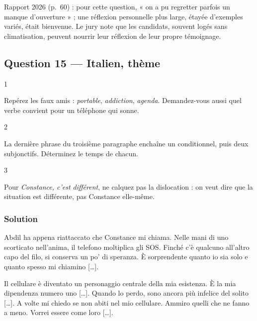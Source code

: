 \documentclass[11pt,a4paper]{article}
\begin{document}
\begin{jury}

Rapport 2026 (p.~60) : pour cette question, « on a pu regretter parfois un manque d'ouverture » ; une réflexion personnelle plus large, étayée d'exemples variés, était bienvenue. Le jury note que les candidats, souvent logés sans climatisation, peuvent nourrir leur réflexion de leur propre témoignage.

\end{jury}

\hypertarget{question-15-italien-thuxe8me}{%
\subsection{Question 15 --- Italien, thème}\label{question-15-italien-thuxe8me}}

\begin{indication}{1}

Repérez les faux amis : \emph{portable}, \emph{addiction}, \emph{agenda}. Demandez-vous aussi quel verbe convient pour un téléphone qui sonne.

\end{indication}

\begin{indication}{2}

La dernière phrase du troisième paragraphe enchaîne un conditionnel, puis deux subjonctifs. Déterminez le temps de chacun.

\end{indication}

\begin{indication}{3}

Pour \emph{Constance, c'est différent}, ne calquez pas la dislocation : on veut dire que la situation est différente, pas Constance elle-même.

\end{indication}

\hypertarget{solution-14}{%
\subsubsection{Solution}\label{solution-14}}

Abdil ha appena riattaccato che Constance mi chiama. Nelle mani di uno scorticato nell'anima, il telefono moltiplica gli SOS. Finché c'è qualcuno all'altro capo del filo, si conserva un po' di speranza. È sorprendente quanto io sia solo e quanto spesso mi chiamino {[}\ldots{]}.

Il cellulare è diventato un personaggio centrale della mia esistenza. È la mia dipendenza numero uno {[}\ldots{]}. Quando lo perdo, sono ancora più infelice del solito {[}\ldots{]}. A volte mi chiedo se non abiti nel mio cellulare. Ammiro quelli che ne fanno a meno. Vorrei essere come loro {[}\ldots{]}.
\end{document}
